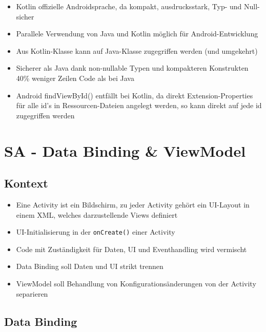 \documentclass[a4paper]{article}
\begin{document}
		\begin{itemize}
			\item Kotlin offizielle Androidsprache, da kompakt, ausdrucksstark, Typ- und Null-sicher
			\item Parallele Verwendung von Java und Kotlin möglich für Android-Entwicklung
			\item Aus Kotlin-Klasse kann auf Java-Klasse zugegriffen werden (und umgekehrt)
			\item Sicherer als Java dank non-nullable Typen und kompakteren Konstrukten \\
				40\% weniger Zeilen Code als bei Java
			\item Android findViewById() entfällt bei Kotlin, da direkt Extension-Properties für alle id's in Ressourcen-Dateien angelegt werden, so kann direkt auf jede id zugegriffen werden
		\end{itemize}
		
	\section{SA - Data Binding \& ViewModel}
	\label{section:databinding}
	
		\subsection{Kontext}
		
		\begin{itemize}
			\item Eine Activity ist ein Bildschirm, zu jeder Activity gehört ein UI-Layout in einem XML, welches darzustellende Views definiert
			\item UI-Initialisierung in der \texttt{onCreate()} einer Activity
			\item Code mit Zuständigkeit für Daten, UI und Eventhandling wird vermischt
			\item Data Binding soll Daten und UI strikt trennen
			\item ViewModel soll Behandlung von Konfigurationsänderungen von der Activity separieren
		\end{itemize}
	
		\subsection{Data Binding}
		
\end{document}
